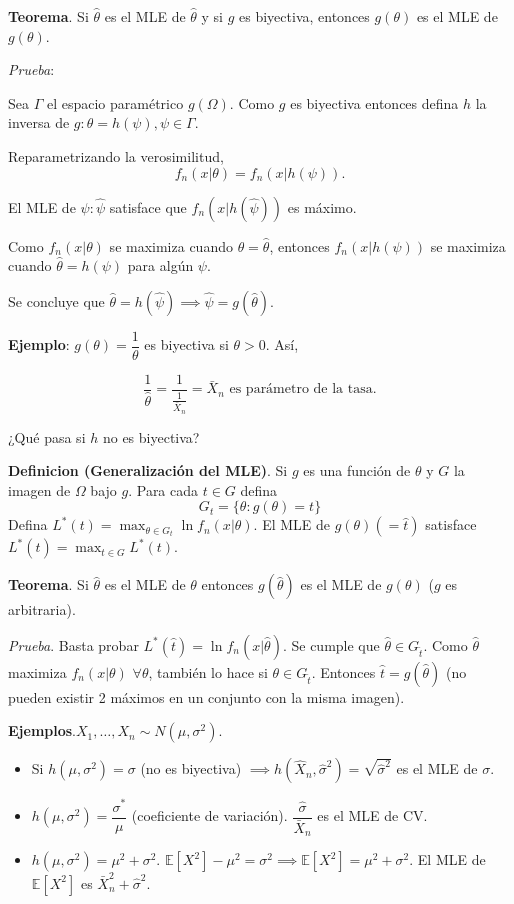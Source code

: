 \documentclass[
  12pt,
]{book}
\begin{document}
\textbf{Teorema}. Si \(\hat\theta\) es el MLE de \(\hat\theta\) y si \(g\) es biyectiva,
entonces \(g(\theta)\) es el MLE de \(g(\theta)\).

\emph{Prueba}:

Sea \(\Gamma\) el espacio paramétrico \(g(\Omega)\). Como \(g\) es biyectiva entonces
defina \(h\) la inversa de \(g\colon \theta = h(\psi), \psi \in \Gamma\).

Reparametrizando la verosimilitud,
\[f_n(x|\theta) = f_n(x|h(\psi)). \]

El MLE de \(\psi:\hat\psi\) satisface que \(f_n(x|h(\hat\psi))\) es máximo.

Como \(f_n(x|\theta)\) se maximiza cuando \(\theta = \hat \theta\), entonces \(f_n(x|h(\psi))\) se
maximiza cuando \(\hat \theta = h(\psi)\) para algún \(\psi\).

Se concluye que \(\hat\theta = h(\hat\psi) \implies \hat\psi = g(\hat \theta)\).

\textbf{Ejemplo}: \(g(\theta) = \dfrac 1\theta\) es biyectiva si \(\theta > 0\). Así,

\begin{equation*} 
\frac{1}{\hat{\theta}} = \frac{1}{\frac{1}{\bar{X}_n}} =
\bar{X}_n \text{ es parámetro de la tasa.} 
\end{equation*}

¿Qué pasa si \(h\) no es biyectiva?

\textbf{Definicion (Generalización del MLE)}. Si \(g\) es una función de \(\theta\) y \(G\)
la imagen de \(\Omega\) bajo \(g\). Para cada \(t\in G\)
defina \[ G_t = \{\theta: g(\theta) = t\}\] Defina
\(L^*(t) = \displaystyle\max_{\theta\in G_t} \ln f_n(x|\theta)\). El MLE de \(g(\theta) (=\hat t)\)
satisface \(L^*(\hat t) = \displaystyle\max_{t \in G} L^*(t)\).

\textbf{Teorema}. Si \(\hat \theta\) es el MLE de \(\theta\) entonces \(g(\hat\theta)\) es el
MLE de \(g(\theta)\) (\(g\) es arbitraria).

\emph{Prueba}. Basta probar \(L^*(\hat t) = \ln f_n(x|\hat \theta)\). Se cumple que
\(\hat\theta\in G_{\hat t}\). Como \(\hat \theta\) maximiza \(f_n(x|\theta)\) \(\forall \theta\), también
lo hace si \(\theta \in G_{\hat t}\). Entonces \(\hat t = g(\hat \theta)\) (no pueden existir 2
máximos en un conjunto con la misma imagen).

\textbf{Ejemplos}.\(X_1,\dots, X_n \sim N(\mu, \sigma^2)\).

\begin{itemize}
\item
  Si \(h(\mu, \sigma^2) = \sigma\) (no es biyectiva) \(\implies h(\hat X_n,\hat\sigma^2) = \sqrt{\hat\sigma^2}\) es el MLE de \(\sigma\).
\item
  \(h(\mu,\sigma^2) = \dfrac{\sigma^*}{\mu}\) (coeficiente de variación). \(\dfrac{\hat{\sigma}}{\bar X_n}\) es el MLE de CV.
\item
  \(h(\mu, \sigma^2) = \mu^2 + \sigma^2\). \(\mathbb{E}[X^2] - \mu^2 = \sigma^2 \implies \mathbb{E}[X^2] = \mu^2 + \sigma^2\). El MLE de \(\mathbb{E}[X^2]\) es \(\bar X_n^2 + \hat \sigma ^2\).
\end{itemize}
\end{document}
